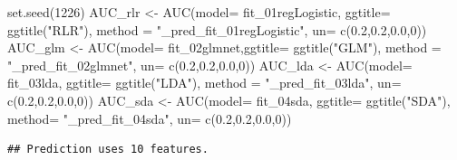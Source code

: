 \documentclass[
]{article}
\newenvironment{Shaded}{\begin{snugshade}}{\end{snugshade}}
\newcommand{\AttributeTok}[1]{\textcolor[rgb]{0.77,0.63,0.00}{#1}}
\newcommand{\DecValTok}[1]{\textcolor[rgb]{0.00,0.00,0.81}{#1}}
\newcommand{\FloatTok}[1]{\textcolor[rgb]{0.00,0.00,0.81}{#1}}
\newcommand{\FunctionTok}[1]{\textcolor[rgb]{0.00,0.00,0.00}{#1}}
\newcommand{\NormalTok}[1]{#1}
\newcommand{\OtherTok}[1]{\textcolor[rgb]{0.56,0.35,0.01}{#1}}
\newcommand{\StringTok}[1]{\textcolor[rgb]{0.31,0.60,0.02}{#1}}
\begin{document}
\begin{Shaded}
\begin{Highlighting}[]
\FunctionTok{set.seed}\NormalTok{(}\DecValTok{1226}\NormalTok{)}
\NormalTok{AUC\_rlr }\OtherTok{\textless{}{-}} \FunctionTok{AUC}\NormalTok{(}\AttributeTok{model=}\NormalTok{ fit\_01regLogistic, }\AttributeTok{ggtitle=} \FunctionTok{ggtitle}\NormalTok{(}\StringTok{"RLR"}\NormalTok{),}
               \AttributeTok{method =} \StringTok{"\_pred\_fit\_01regLogistic"}\NormalTok{,}
               \AttributeTok{un=} \FunctionTok{c}\NormalTok{(}\FloatTok{0.2}\NormalTok{,}\FloatTok{0.2}\NormalTok{,}\FloatTok{0.0}\NormalTok{,}\DecValTok{0}\NormalTok{))}
\NormalTok{AUC\_glm }\OtherTok{\textless{}{-}} \FunctionTok{AUC}\NormalTok{(}\AttributeTok{model=}\NormalTok{ fit\_02glmnet,}\AttributeTok{ggtitle=} \FunctionTok{ggtitle}\NormalTok{(}\StringTok{"GLM"}\NormalTok{),}
               \AttributeTok{method =} \StringTok{"\_pred\_fit\_02glmnet"}\NormalTok{,}
               \AttributeTok{un=} \FunctionTok{c}\NormalTok{(}\FloatTok{0.2}\NormalTok{,}\FloatTok{0.2}\NormalTok{,}\FloatTok{0.0}\NormalTok{,}\DecValTok{0}\NormalTok{))}
\NormalTok{AUC\_lda }\OtherTok{\textless{}{-}} \FunctionTok{AUC}\NormalTok{(}\AttributeTok{model=}\NormalTok{ fit\_03lda, }\AttributeTok{ggtitle=} \FunctionTok{ggtitle}\NormalTok{(}\StringTok{"LDA"}\NormalTok{),}
               \AttributeTok{method =} \StringTok{"\_pred\_fit\_03lda"}\NormalTok{,}
               \AttributeTok{un=} \FunctionTok{c}\NormalTok{(}\FloatTok{0.2}\NormalTok{,}\FloatTok{0.2}\NormalTok{,}\FloatTok{0.0}\NormalTok{,}\DecValTok{0}\NormalTok{))}
\NormalTok{AUC\_sda }\OtherTok{\textless{}{-}} \FunctionTok{AUC}\NormalTok{(}\AttributeTok{model=}\NormalTok{ fit\_04sda, }\AttributeTok{ggtitle=} \FunctionTok{ggtitle}\NormalTok{(}\StringTok{"SDA"}\NormalTok{),}
               \AttributeTok{method=} \StringTok{"\_pred\_fit\_04sda"}\NormalTok{,}
               \AttributeTok{un=} \FunctionTok{c}\NormalTok{(}\FloatTok{0.2}\NormalTok{,}\FloatTok{0.2}\NormalTok{,}\FloatTok{0.0}\NormalTok{,}\DecValTok{0}\NormalTok{))}
\end{Highlighting}
\end{Shaded}

\begin{verbatim}
## Prediction uses 10 features.
\end{verbatim}
\end{document}
